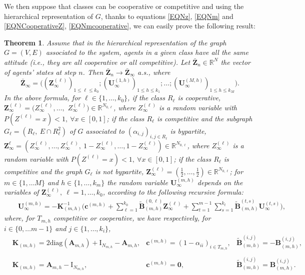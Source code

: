 \documentclass[article,12pt]{article}
\theoremstyle{plain}
\newtheorem{theorem}{Theorem}[section]
\theoremstyle{definition}
\theoremstyle{remark}
\numberwithin{equation}{section}
\numberwithin{theorem}{section}
\newcommand{\R}{\mathbb R}
\begin{document}
		We then suppose that classes can be cooperative or competitive and using the hierarchical representation of $G$, thanks to equations \eqref{EQNz}, \eqref{EQNm} and \eqref{EQNCooperativeZ}, \eqref{EQNmcooperative}, we can easily prove the following result: 
		
		
		\begin{theorem}
			Assume that in the hierarchical representation  of the graph $G=(V,E)$ associated to the system, agents in a given class have all the same attitude (i.e., they are all cooperative or all competitive). Let $\mathbf{\bar{Z}}_n\in \R^N$ the vector of agents' states at step $n$. Then $\mathbf{\bar{Z}}_n\longrightarrow \mathbf{\bar{Z}}_\infty$ a.s., where $$\mathbf{\bar{Z}}_\infty=\big( (\mathbf{Z}^{(\ell)}_\infty)_{1\leq\ell\leq k_0}; (\mathbf{U}^{(1, h)}_\infty)_{1\leq h\leq k_1}; \ldots ;(\mathbf{U}^{(M, h)}_\infty)_{1\leq h\leq k_M}\big).$$ In the above formula, for $\ell\in \{1,\ldots, k_0\}$, if the class $R_\ell$ is cooperative, $\mathbf{Z}^{(\ell)}_\infty= (Z_\infty^{(\ell)},\ldots,$  $Z^{(\ell)}_\infty)\in \R^{N_{0,\ell}}$, where $Z^{(\ell)}_\infty$ is a random variable with $P(Z^{(\ell)}=x)<1,\  \forall x\in [0,1]$; if the class $R_\ell$ is competitive and the subgraph $G_\ell=(R_{\ell},\  E\cap R_\ell^2)$ of $G$ associated to $(\alpha_{i,j})_{i,j\in R_\ell}$ is bypartite,
			$\mathbf{Z}^{\ell}_\infty=(Z^{(\ell)}_\infty,\ldots , Z^{(\ell)}_\infty,\  1-Z^{(\ell)}_\infty,\ldots, 1-Z^{(\ell)}_\infty)\in \R^{N_{0,\ell}}$, 
			where $Z^{(\ell)}_\infty$ is a random variable with $P(Z^{(\ell)}=x)<1,\  \forall x\in [0,1]$; 
			if the class $R_\ell$ is competitive and the graph $G_\ell$ is not bypartite, 
			$\mathbf{Z}^{(\ell)}_\infty=(\frac{1}{2},\ldots, \frac{1}{2})\in \R^{N_{0,\ell}}$;  for $m\in \{1,\ldots M\}$ and $h\in \{1,\ldots, k_m\}$ the random variable $\mathbf{U}^{(m,h)}_\infty$ depends on the variables of $\mathbf{Z}^{(\ell)}_\infty,\ \ell=1,\ldots, k_0$, according to the following recursive formula:   
			\begin{eqnarray*}
				& &\mathbf{U}^{(m, h)}_{\infty}=-\mathbf{K}_{(m, h)}^{-1} \Big(\mathbf{c}^{(m, h)}+ \sum_{\ell=1}^{k_0} \widetilde{\mathbf{B}}_{(m, h)}^{(0, \ell)}\mathbf{Z}^{(\ell)}_\infty +\sum_{t=1}^{m-1} \sum_{s=1}^{k_t} \widetilde{\mathbf{B}}_{(m, h)}^{(t, s)} \mathbf{U}^{(t, s)}_\infty\Big),
			\end{eqnarray*}
			where, for $T_{m,h}$ competitive or cooperative, we have respectively, for $ i\in\{0,\ldots m-1\}$ and $j\in \{1,\ldots, k_i\}$, 
			\begin{equation*}
				\begin{array}{lllccc}
					&\mathbf{K}_{(m,h)}= 2\mathrm{diag}(\mathbf{A}_{m,h})+\mathrm{I}_{N_{m,h}}-\mathbf{A}_{m,h}, &\mathbf{c}^{(m, h)}=(1-\alpha_{ii})_{i\in T_{m, h}}, & \widetilde{\mathbf{B}}_{(m,h)}^{(i,j)}=-\mathbf{B}_{(m,h)}^{(i,j)},\\  
					& \\
					&\mathbf{K}_{(m,h)}=\mathbf{A}_{m,h}-\mathrm{I}_{N_{m,h}},  &\mathbf{c}^{(m, h)}=\mathbf{0}, &\widetilde{\mathbf{B}}_{(m,h)}^{(i,j)}=\mathbf{B}_{(m,h)}^{(i,j)}.\\
				\end{array}
			\end{equation*}
		\end{theorem}
\end{document}

